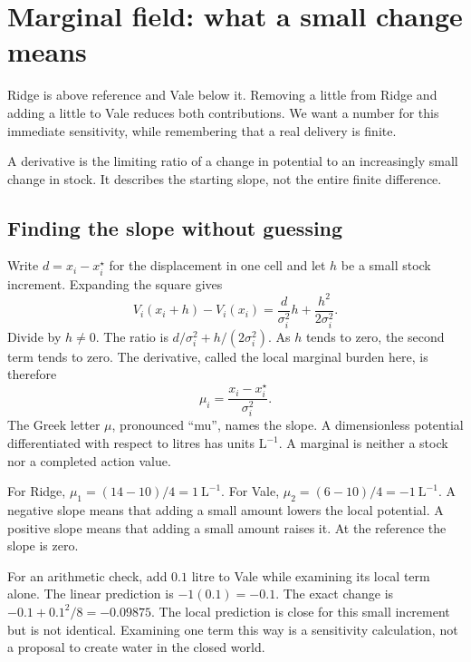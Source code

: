 \chapter{Marginal field: what a small change means}\label{ch:marginal}

Ridge is above reference and Vale below it. Removing a little from Ridge and adding a little to Vale reduces both contributions. We want a number for this immediate sensitivity, while remembering that a real delivery is finite.

A derivative is the limiting ratio of a change in potential to an increasingly small change in stock. It describes the starting slope, not the entire finite difference.

\section{Finding the slope without guessing}
Write $d=x_i-x_i^\star$ for the displacement in one cell and let $h$ be a small stock increment. Expanding the square gives
\begin{equation*}
 V_i(x_i+h)-V_i(x_i)
 =\frac{d}{\sigma_i^2}h+\frac{h^2}{2\sigma_i^2}.
\end{equation*}
Divide by $h\ne0$. The ratio is $d/\sigma_i^2+h/(2\sigma_i^2)$. As $h$ tends to zero, the second term tends to zero. The derivative, called the local marginal burden here, is therefore
\begin{equation}\label{eq:mu}
 \mu_i=\frac{x_i-x_i^\star}{\sigma_i^2}.
\end{equation}
The Greek letter $\mu$, pronounced ``mu'', names the slope. A dimensionless potential differentiated with respect to litres has units $\mathrm{L}^{-1}$. A marginal is neither a stock nor a completed action value.

For Ridge, $\mu_1=(14-10)/4=1\ \mathrm{L}^{-1}$. For Vale, $\mu_2=(6-10)/4=-1\ \mathrm{L}^{-1}$. A negative slope means that adding a small amount lowers the local potential. A positive slope means that adding a small amount raises it. At the reference the slope is zero.

For an arithmetic check, add $0.1$ litre to Vale while examining its local term alone. The linear prediction is $-1(0.1)=-0.1$. The exact change is $-0.1+0.1^2/8=-0.09875$. The local prediction is close for this small increment but is not identical. Examining one term this way is a sensitivity calculation, not a proposal to create water in the closed world.

